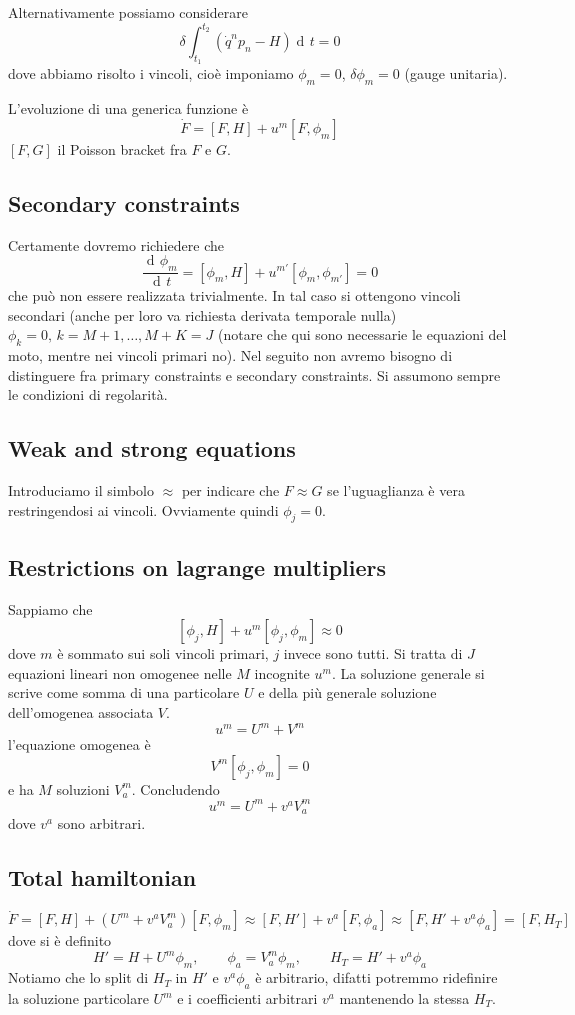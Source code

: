 \documentclass[a4paper, 11pt]{article}
\newcommand{\dd}{\mathop{\mathrm{d}\!}{}}
\newcommand{\deriv}[2]{\dfrac{\dd #1}{\dd #2}}
\begin{document}
	Alternativamente possiamo considerare
	\[ \delta \int_{t_1}^{t_2} \left( \dot{q}^{n} p_n - H \right) \dd t = 0 \]
	dove abbiamo risolto i vincoli, cioè imponiamo $\phi_m=0$, $\delta \phi_m = 0$ (gauge unitaria).
	
	L'evoluzione di una generica funzione è
	\[ \dot{F} = [F, H] + u^m[F, \phi_m] \]
	$[F, G]$ il Poisson bracket fra $F$ e $G$.
	
	\subsection{Secondary constraints}
	Certamente dovremo richiedere che
	\[ \deriv{\phi_m}{t} = [\phi_m, H] + u^{m'} [\phi_m, \phi_{m'}] = 0 \]
	che può non essere realizzata trivialmente. In tal caso si ottengono vincoli secondari (anche per loro va richiesta derivata temporale nulla) $\phi_k=0,\,k=M+1,\dots,M+K=J$ (notare che qui sono necessarie le equazioni del moto, mentre nei vincoli primari no). Nel seguito non avremo bisogno di distinguere fra {primary constraints} e {secondary constraints}. Si assumono sempre le condizioni di regolarità.
	
	\subsection{Weak and strong equations}
	Introduciamo il simbolo $\approx$ per indicare che $F\approx G$ se l'uguaglianza è vera restringendosi ai vincoli. Ovviamente quindi $\phi_j=0$.
	
	\subsection{Restrictions on lagrange multipliers}
	Sappiamo che
	\[ [\phi_j, H] + u^m [\phi_j, \phi_m] \approx 0 \]
	dove $m$ è sommato sui soli vincoli primari, $j$ invece sono tutti. Si tratta di $J$ equazioni lineari non omogenee nelle $M$ incognite $u^m$.
	La soluzione generale si scrive come somma di una particolare $U$ e della più generale soluzione dell'omogenea associata $V$.
	\[ u^m = U^m + V^m \]
	l'equazione omogenea è
	\[ V^m[\phi_j, \phi_m] = 0 \]
	e ha $M$ soluzioni $V^m_a$. Concludendo
	\[ u^m = U^m + v^a V_a^m \] 
	dove $v^a$ sono arbitrari.
	
	\subsection{Total hamiltonian}
	\[ \dot{F} = [F, H] + (U^m+v^aV_a^m) [F, \phi_m] \approx [F, H'] + v^a[F, \phi_a] \approx [F, H' + v^a \phi_a] = [F, H_T] \]
	dove si è definito
	\[ H' = H + U^m \phi_m, \qquad \phi_a = V_a^m \phi_m,\qquad H_T = H' + v^a \phi_a \]
	Notiamo che lo split di $H_T$ in $H'$ e $v^a\phi_a$ è arbitrario, difatti potremmo ridefinire la soluzione particolare $U^m$ e i coefficienti arbitrari $v^a$ mantenendo la stessa $H_T$.
	
\end{document}
